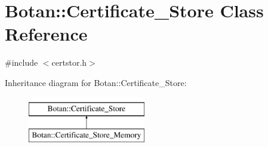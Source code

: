 \hypertarget{classBotan_1_1Certificate__Store}{\section{Botan\-:\-:Certificate\-\_\-\-Store Class Reference}
\label{classBotan_1_1Certificate__Store}
}


{\ttfamily \#include $<$certstor.\-h$>$}

Inheritance diagram for Botan\-:\-:Certificate\-\_\-\-Store\-:\begin{figure}[H]
\begin{center}
\leavevmode
\includegraphics[height=2.000000cm]{classBotan_1_1Certificate__Store}
\end{center}
\end{figure}
